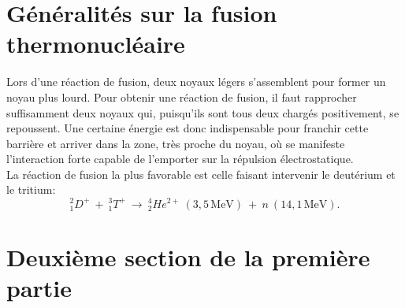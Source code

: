 \section{Généralités sur la fusion thermonucléaire}
Lors d'une réaction de fusion, deux noyaux légers s'assemblent pour former un noyau plus lourd. Pour obtenir une réaction de fusion, il faut rapprocher suffisamment deux noyaux qui, puisqu'ils sont tous deux chargés positivement, se repoussent. Une certaine énergie est donc indispensable pour franchir cette barrière et arriver dans la zone, très proche du noyau, où se manifeste l'interaction forte capable de l'emporter sur la répulsion électrostatique.
\\ %
La réaction de fusion la plus favorable est celle faisant intervenir le deutérium et le tritium: $$_{1}^{2}D^{+}~+~_{1}^{3}T^{+}~\rightarrow ~_{2}^{4}He^{2+}~(3,5\,\textrm{MeV})~+~n~(14,1\,\textrm{MeV}).$$
\noindent %
\lipsum[1]
\section{Deuxième section de la première partie}
\lipsum[2]
